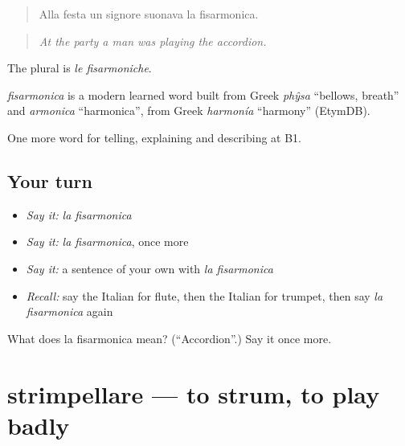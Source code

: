 \begin{quote}
Alla festa un signore suonava la fisarmonica.
\end{quote}

\begin{quote}
\emph{At the party a man was playing the accordion.}
\end{quote}

The plural is \emph{le fisarmoniche}.

\begin{cousinweb}
\emph{fisarmonica} is a modern learned word built from Greek \emph{phŷsa} \textquotedblleft{}bellows, breath\textquotedblright{} and \emph{armonica} \textquotedblleft{}harmonica\textquotedblright{}, from Greek \emph{harmonía} \textquotedblleft{}harmony\textquotedblright{} (EtymDB).
\end{cousinweb}

\begin{grammarlens}[title={What you've built}]
One more word for telling, explaining and describing at B1.
\end{grammarlens}

\subsection*{Your turn}
\begin{itemize}
\raggedright
  \item \emph{Say it:} \emph{la fisarmonica}
  \item \emph{Say it:} \emph{la fisarmonica}, once more
  \item \emph{Say it:} a sentence of your own with \emph{la fisarmonica}
  \item \emph{Recall:} say the Italian for flute, then the Italian for trumpet, then say \emph{la fisarmonica} again
\end{itemize}

\begin{tcolorbox}[breakable,colback=teal!4,colframe=teal!35!black,title={Before you move on}]
What does la fisarmonica mean? (\textquotedblleft{}Accordion\textquotedblright{}.) Say it once more.
\end{tcolorbox}
\section[strimpellare]{strimpellare — to strum, to play badly}

\label{lesson:IT-C516-strimpellare}




